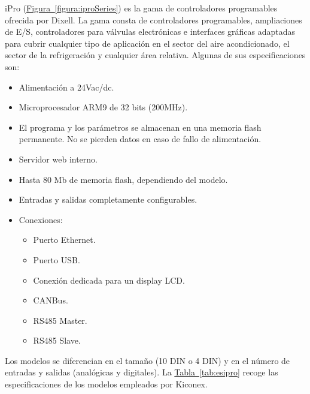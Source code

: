 iPro (\hyperref[figura:iproSeries]{Figura~\ref{figura:iproSeries}}) es la gama de controladores programables ofrecida por Dixell. La gama consta de controladores programables, ampliaciones de E/S, controladores para válvulas electrónicas e interfaces gráficas adaptadas para cubrir cualquier tipo de aplicación en el sector del aire acondicionado, el sector de la refrigeración y cualquier área relativa. Algunas de sus especificaciones son:

\begin{itemize}
  \item Alimentación a 24Vac/dc.
  \item Microprocesador ARM9 de 32 bits (200MHz).
  \item El programa y los parámetros se almacenan en una memoria flash permanente. No se pierden datos en caso de fallo de alimentación.
  \item Servidor web interno.
  \item Hasta 80 Mb de memoria flash, dependiendo del modelo.
  \item Entradas y salidas completamente configurables.
  \item Conexiones:
  \begin{itemize}
    \item Puerto Ethernet.
    \item Puerto USB.
    \item Conexión dedicada para un display LCD.
    \item CANBus.
    \item RS485 Master.
    \item RS485 Slave.
  \end{itemize}
\end{itemize}

Los modelos se diferencian en el tamaño (10 DIN o 4 DIN) y en el número de entradas y salidas (analógicas y digitales). La \hyperref[tab:esipro]{Tabla~\ref{tab:esipro}} recoge las especificaciones de los modelos empleados por Kiconex.

